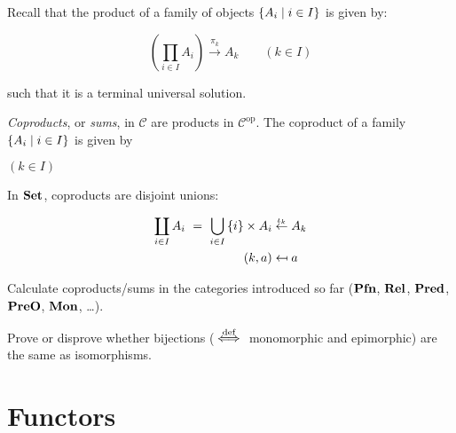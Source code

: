 Recall that the product of a family of objects $\{ A_i \mid i \in I \}$
is given by:

\begin{equation*}
    \left(\prod_{i\in I} A_i\right) \xrightarrow{\pi_k} A_k
    \qquad (k\in I)
\end{equation*}

such that it is a terminal universal solution.

\begin{definition}
\emph{Coproducts}, or \emph{sums}, in $\mathcal{C}$ are products in
$\mathcal{C}^{\mathrm{op}}$. The coproduct of a family
$\{ A_i \mid i \in I \}$ is given by

\begin{center}
    \qquad$(k\in I)$
\end{center}
\end{definition}

In $\mathbf {Set}$, coproducts are disjoint unions:

\begin{equation*}
    \begin{aligned}
        \coprod_{i \in I} A_i \ = \ \bigcup_{i \in I}\, \setof{i} \times A_i &
        \overset{\iota_k}{\leftarrow} A_k
        \\
        (k, a) &
        \mapsfrom a
    \end{aligned}
\end{equation*}

\begin{exercise}
Calculate coproducts/sums in the categories introduced so far ($\mathbf {Pfn}$,
$\mathbf {Rel}$, $\mathbf {Pred}$, $\mathbf {PreO}$, $\mathbf {Mon}$, \dots).
\end{exercise}

\begin{exercise}
Prove or disprove whether bijections ($\stackrel{\text{def}}{\iff}$ monomorphic and epimorphic) are
the same as isomorphisms.
\end{exercise}

\section{Functors}

